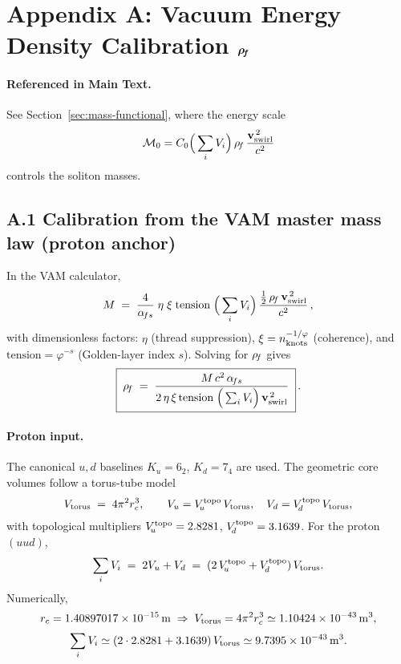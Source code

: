 \section*{Appendix A: Vacuum Energy Density Calibration \texorpdfstring{\(\boldsymbol{\rho_{\!f}}\)}{rho0}}
\label{sec:calibration_rho0}

\paragraph{Referenced in Main Text.}
See Section~\ref{sec:mass-functional}, where the energy scale
\[
 \mathcal{M}_0 = C_0 \Big(\sum_i V_i\Big)\,\rho_{\!f}\,\frac{\mathbf{v}_{\mathrm{swirl}}^{\,2}}{c^2}
\]
controls the soliton masses.

\subsection*{A.1 Calibration from the VAM master mass law (proton anchor)}
In the VAM calculator,
\[
 M \;=\; \frac{4}{\alpha_{\!fs}}\;\eta\;\xi\;\text{tension}\;\Big(\sum_i V_i\Big)\,
 \frac{\tfrac12\,\rho_{\!f}\,\mathbf{v}_{\mathrm{swirl}}^{\,2}}{c^2}\,,
\]
with dimensionless factors:
\(\eta\) (thread suppression), \(\xi=n_{\rm knots}^{-1/\varphi}\) (coherence), and \(\text{tension}=\varphi^{-s}\) (Golden-layer index \(s\)).
Solving for \(\rho_{\!f}\) gives
\begin{equation}
 \boxed{\;
 \rho_{\!f} \;=\; \frac{M\,c^2\,\alpha_{\!fs}}
 {2\,\eta\,\xi\,\text{tension}\;\Big(\sum_i V_i\Big)\,\mathbf{v}_{\mathrm{swirl}}^{\,2}}\; } \,.
 \label{eq:rho0-solve}
\end{equation}

\paragraph{Proton input.}
The canonical \(u,d\) baselines \(K_u=6_2\), \(K_d=7_4\) are used.
The geometric core volumes follow a torus-tube model
\[
    V_{\rm torus} \;=\; 4\pi^2 r_c^3,\qquad
    V_u = V_{\!u}^{\rm topo}\,V_{\rm torus},\quad V_d = V_{\!d}^{\rm topo}\,V_{\rm torus},
\]
with topological multipliers
\(V_{\!u}^{\rm topo}=2.8281\), \(V_{\!d}^{\rm topo}=3.1639\).
For the proton \((uud)\),
\[
    \sum_i V_i \;=\; 2V_u + V_d \;=\; (2\,V_{\!u}^{\rm topo}+V_{\!d}^{\rm topo})\,V_{\rm torus}.
\]
Numerically,
\[
    r_c = 1.40897017\times 10^{-15}\,\mathrm{m}
    \;\Rightarrow\;
    V_{\rm torus} = 4\pi^2 r_c^3 \simeq 1.10424\times10^{-43}\,\mathrm{m^3},
\]
\[
    \sum_i V_i \simeq (2\cdot 2.8281 + 3.1639)\,V_{\rm torus}
    \simeq 9.7395\times 10^{-43}\,\mathrm{m^3}.
\]


